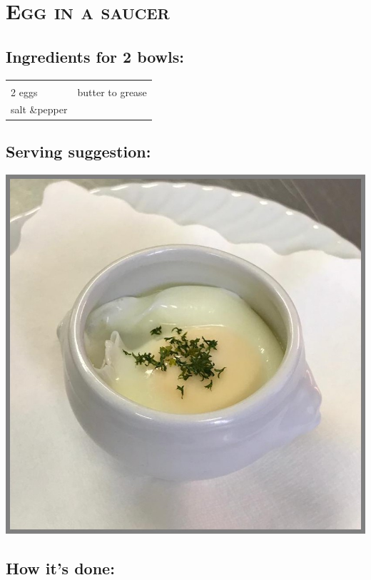 \section{\textsc{Egg in a saucer}}

\subsection*{Ingredients for 2 bowls:}

\begin{tabular}{p{7.5cm} p{7.5cm}}
	& \\
	2 eggs & butter to grease \\
	salt \&pepper &
\end{tabular}

\subsection*{Serving suggestion:}

\includegraphics[width=\textwidth]{img/ei_naepfchen.jpg} \cite{eiimnaepfchen}

\subsection*{How it's done:}

